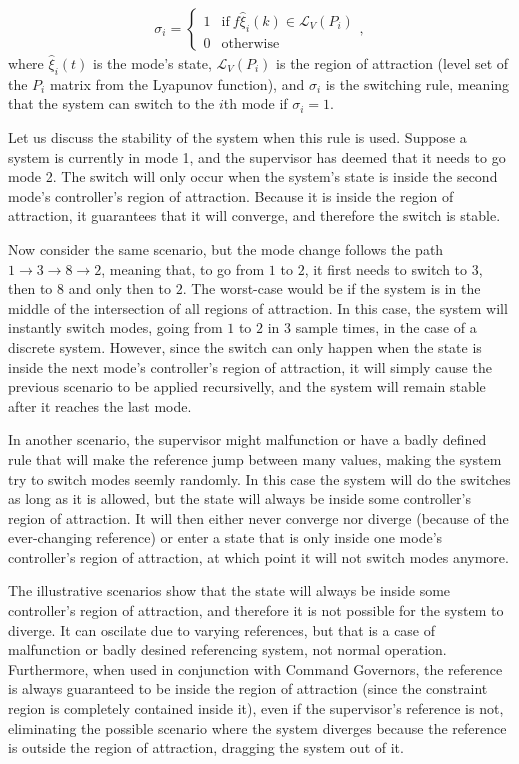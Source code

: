 \begin{align}
  \sigma_{i} = \begin{cases}
    1 & \textrm{if}~f\hat{\xi}_{i}(k)\in\mathcal{L}_V(P_i) \\
    0 & \textrm{otherwise}
  \end{cases},
\end{align}
%
where \(\hat{\xi}_{i}(t)\) is the mode's state, \(\mathcal{L}_V(P_i)\) is the
region of attraction (level set of the \(P_{i}\) matrix from the Lyapunov
function), and \(\sigma_{i}\) is the switching rule, meaning that the system can
switch to the \(i\)th mode if \(\sigma_{i}=1\).

Let us discuss the stability of the system when this rule is used. Suppose a
system is currently in mode 1, and the supervisor has deemed that it needs to go
mode 2. The switch will only occur when the system's state is inside the second
mode's controller's region of attraction. Because it is inside the region of
attraction, it guarantees that it will converge, and therefore the switch is
stable.

Now consider the same scenario, but the mode change follows the path
\(1 \rightarrow 3 \rightarrow 8 \rightarrow 2\), meaning that, to go from \(1\) to \(2\), it first needs to
switch to \(3\), then to \(8\) and only then to \(2\). The worst-case would be
if the system is in the middle of the intersection of all regions of attraction.
In this case, the system will instantly switch modes, going from \(1\) to \(2\)
in \(3\) sample times, in the case of a discrete system. However, since the
switch can only happen when the state is inside the next mode's controller's
region of attraction, it will simply cause the previous scenario to be applied
recursivelly, and the system will remain stable after it reaches the last mode.

In another scenario, the supervisor might malfunction or have a badly defined
rule that will make the reference jump between many values, making the system
try to switch modes seemly randomly. In this case the system will do the
switches as long as it is allowed, but the state will always be inside some
controller's region of attraction. It will then either never converge nor
diverge (because of the ever-changing reference) or enter a state that is only
inside one mode's controller's region of attraction, at which point it will not
switch modes anymore.

The illustrative scenarios show that the state will always be inside some
controller's region of attraction, and therefore it is not possible for the
system to diverge. It can oscilate due to varying references, but that is a case
of malfunction or badly desined referencing system, not normal operation.
Furthermore, when used in conjunction with Command Governors, the reference is
always guaranteed to be inside the region of attraction (since the constraint
region is completely contained inside it), even if the supervisor's reference is
not, eliminating the possible scenario where the system diverges because the
reference is outside the region of attraction, dragging the system out of it.

